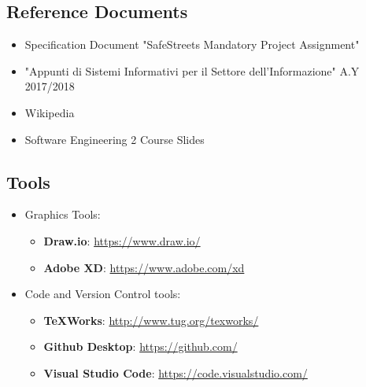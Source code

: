 \documentclass[12pt,a4paper]{article}
\begin{document}
\subsection{Reference Documents} 
\begin{itemize}
\item Specification Document "SafeStreets Mandatory Project Assignment"
\item "Appunti di Sistemi Informativi per il Settore dell'Informazione" A.Y 2017/2018
\item Wikipedia
\item Software Engineering 2 Course Slides
\end{itemize}
\subsection{Tools}
\begin{itemize}
\item Graphics Tools:
	\begin{itemize}
		\item \textbf{Draw.io}: \url{https://www.draw.io/}
		\item \textbf{Adobe XD}: \url{https://www.adobe.com/xd}
	\end{itemize}
\item Code and Version Control tools:
\begin{itemize}
	\item \textbf{TeXWorks}: \url{http://www.tug.org/texworks/}
	\item \textbf{Github Desktop}: \url{https://github.com/}
	\item \textbf{Visual Studio Code}: \url{https://code.visualstudio.com/}
\end{itemize}

\end{itemize}
\end{document}
